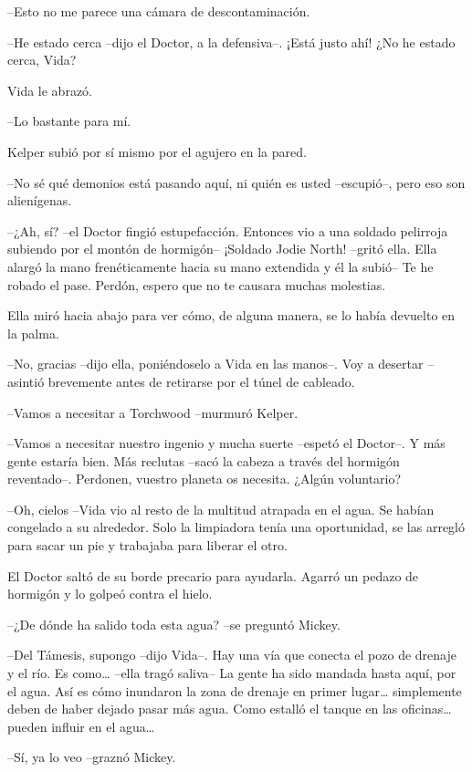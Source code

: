 {--Esto no me parece una cámara de descontaminación.}

{--He estado cerca --dijo el Doctor, a la defensiva--. ¡Está justo ahí!
¿No he estado cerca, Vida?}

{Vida le abrazó.}

{--Lo bastante para mí.}

{Kelper subió por sí mismo por el agujero en la pared.}

{--No sé qué demonios está pasando aquí, ni quién es usted --escupió--,
pero eso son alienígenas.}

{--¿Ah, sí? --el Doctor fingió estupefacción. Entonces vio a una soldado
 pelirroja subiendo por el montón de hormigón-- ¡Soldado Jodie North!
 --gritó ella. Ella alargó la mano frenéticamente hacia su mano extendida
 y él la subió-- Te he robado el pase. Perdón, espero que no te causara
muchas molestias.}

{Ella miró hacia abajo para ver cómo, de alguna manera, se lo había
devuelto en la palma.}

{--No, gracias --dijo ella, poniéndoselo a Vida en las manos--. Voy a
 desertar --asintió brevemente antes de retirarse por el túnel de
cableado.}

{--Vamos a necesitar a Torchwood --murmuró Kelper.}

{--Vamos a necesitar nuestro ingenio y mucha suerte --espetó el
 Doctor--. Y más gente estaría bien. Más reclutas --sacó la cabeza a
 través del hormigón reventado--. Perdonen, vuestro planeta os necesita.
¿Algún voluntario?}

{--Oh, cielos --Vida vio al resto de la multitud atrapada en el agua. Se
 habían congelado a su alrededor. Solo la limpiadora tenía una
 oportunidad, se las arregló para sacar un pie y trabajaba para liberar
el otro.}

{El Doctor saltó de su borde precario para ayudarla. Agarró un pedazo de
hormigón y lo golpeó contra el hielo.}

{--¿De dónde ha salido toda esta agua? --se preguntó Mickey.}

{--Del Támesis, supongo --dijo Vida--. Hay una vía que conecta el pozo
 de drenaje y el río. Es como\ldots{} --ella tragó saliva-- La gente ha
 sido mandada hasta aquí, por el agua. Así es cómo inundaron la zona de
 drenaje en primer lugar\ldots{} simplemente deben de haber dejado pasar
 más agua. Como estalló el tanque en las oficinas\ldots{} pueden influir
 en el agua\ldots{}}

{--Sí, ya lo veo --graznó Mickey.}

